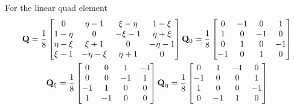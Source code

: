 \documentclass{article}
\begin{document}
For the linear quad element
%
\begin{multline}
{\bf Q} = \frac{1}{8}\begin{bmatrix}
0 & \eta - 1 & \xi - \eta & 1 - \xi\\
1 - \eta & 0 &  - \xi - 1 & \eta + \xi\\
\eta - \xi & \xi + 1 & 0 &  - \eta - 1\\
\xi - 1 &  - \eta - \xi & \eta + 1 & 0
\end{bmatrix}
{\bf Q}_0 = \frac{1}{8}\begin{bmatrix}
0 & - 1 & 0 & 1 \\
1 & 0 &  - 1 & 0\\
0 & 1 & 0 &  - 1\\
- 1 &  0 &  1 & 0
\end{bmatrix} \\
{\bf Q}_\xi = \frac{1}{8}\begin{bmatrix}
0 & 0 & 1 & -1 \\
0 & 0 &  - 1 & 1\\
- 1 & 1 & 0 & 0\\
1 &  - 1 & 0 & 0
\end{bmatrix}
{\bf Q}_\eta = \frac{1}{8}\begin{bmatrix}
0 & 1  & - 1 & 0\\
- 1 & 0 &  0 & 1 \\
1  & 0 & 0 &  - 1\\
0 &  - 1 & 1 & 0
\end{bmatrix}
\end{multline}
\end{document}
